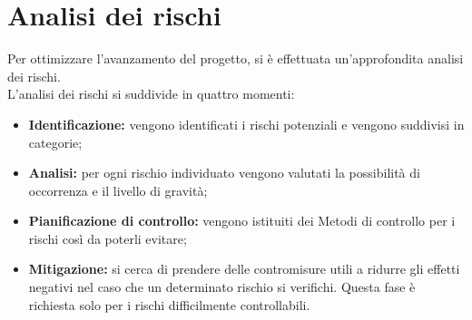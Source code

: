 \section{Analisi dei rischi}
Per ottimizzare l'avanzamento del progetto, si è effettuata un'approfondita analisi dei
rischi. \\
L'analisi dei rischi si suddivide in quattro momenti: \\
\begin{itemize}
	\item \textbf{Identificazione:} vengono identificati i rischi potenziali e vengono suddivisi in categorie;
	\item \textbf{Analisi:} per ogni rischio individuato vengono valutati la possibilità di occorrenza e il livello di gravità;
	\item \textbf{Pianificazione di controllo:} vengono istituiti dei Metodi di controllo per i rischi così da poterli evitare;
	\item \textbf{Mitigazione:} si cerca di prendere delle contromisure utili a ridurre gli effetti negativi nel caso che un determinato rischio si verifichi. Questa fase è richiesta solo per i rischi difficilmente controllabili. \\
\end{itemize}
\def\arraystretch{1.5}
